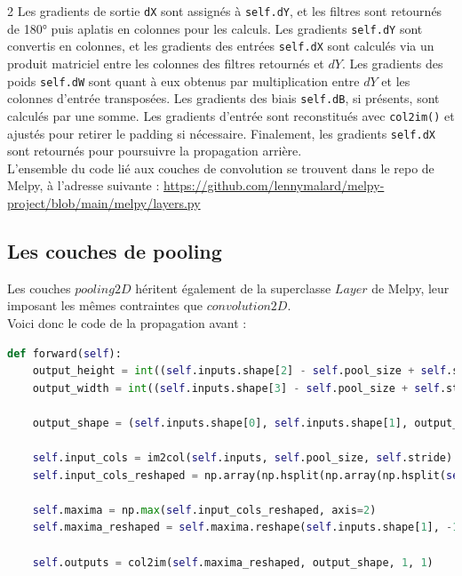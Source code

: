 \begin{multicols}{2}
Les gradients de sortie \texttt{dX} sont assignés à \texttt{self.dY}, et les filtres sont 
retournés de \ang{180} puis aplatis en colonnes pour les calculs. Les gradients \texttt{self.dY} 
sont convertis en colonnes, et les gradients des entrées \texttt{self.dX} sont calculés 
via un produit matriciel entre les colonnes des filtres retournés et $dY$. 
Les gradients des poids \texttt{self.dW} sont quant à eux obtenus par multiplication entre $dY$ et 
les colonnes d’entrée transposées. Les gradients des biais \texttt{self.dB}, si présents, sont calculés par une somme. 
Les gradients d’entrée sont reconstitués avec \texttt{col2im()} et ajustés pour retirer le padding si nécessaire. 
Finalement, les gradients \texttt{self.dX} sont retournés pour poursuivre la propagation arrière. \\

L'ensemble du code lié aux couches de convolution se trouvent dans le repo de Melpy, à l'adresse suivante : \url{https://github.com/lennymalard/melpy-project/blob/main/melpy/layers.py}

\subsection{Les couches de pooling}

Les couches $pooling2D$ héritent également de la superclasse $Layer$ 
de Melpy, leur imposant les mêmes contraintes que $convolution2D$.\\

Voici donc le code de la propagation avant : \\

\begin{lstlisting}[language=Python]
def forward(self):
    output_height = int((self.inputs.shape[2] - self.pool_size + self.stride) // self.stride)
    output_width = int((self.inputs.shape[3] - self.pool_size + self.stride) // self.stride)

    output_shape = (self.inputs.shape[0], self.inputs.shape[1], output_height, output_width)

    self.input_cols = im2col(self.inputs, self.pool_size, self.stride)
    self.input_cols_reshaped = np.array(np.hsplit(np.array(np.hsplit(self.input_cols, self.inputs.shape[0])), self.inputs.shape[1]))

    self.maxima = np.max(self.input_cols_reshaped, axis=2)
    self.maxima_reshaped = self.maxima.reshape(self.inputs.shape[1], -1)

    self.outputs = col2im(self.maxima_reshaped, output_shape, 1, 1)


\end{lstlisting}
\end{multicols}
